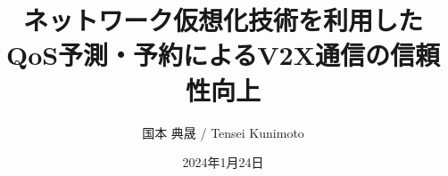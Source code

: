 \documentclass[a4paper,11pt,uplatex]{ujreport}
\title{ネットワーク仮想化技術を利用した\\QoS予測・予約によるV2X通信の信頼性向上}  %
\author{国本 典晟 / Tensei Kunimoto}  %
\date{2024年1月24日}  %
\begin{document}
\maketitle
\clearpage

\begin{abstract}



\end{abstract}
\end{document}
